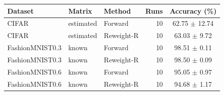 \begin{tabular}{lllrc}
Dataset & Matrix & Method & Runs & Accuracy (\%) \\
\hline
CIFAR & estimated & Forward & 10 & 62.75 $\pm$ 12.74 \\
CIFAR & estimated & Reweight-R & 10 & 63.03 $\pm$ 9.72 \\
FashionMNIST0.3 & known & Forward & 10 & 98.51 $\pm$ 0.11 \\
FashionMNIST0.3 & known & Reweight-R & 10 & 98.50 $\pm$ 0.09 \\
FashionMNIST0.6 & known & Forward & 10 & 95.05 $\pm$ 0.97 \\
FashionMNIST0.6 & known & Reweight-R & 10 & 94.68 $\pm$ 1.17 \\
\end{tabular}
